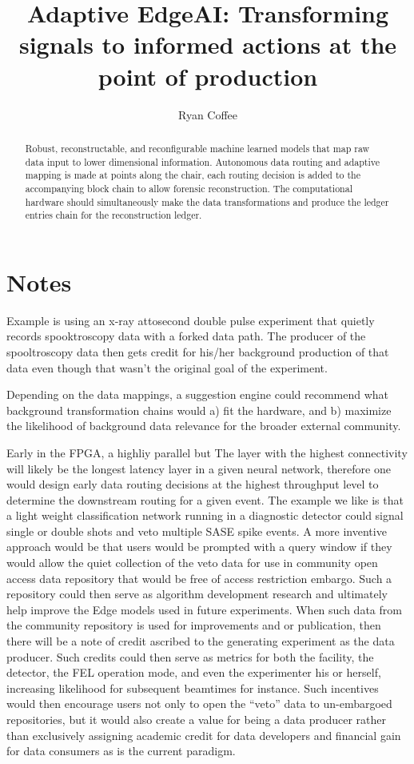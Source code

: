 \documentclass{article}
\title{Adaptive EdgeAI: Transforming signals to informed actions at the point of production}
\author{Ryan Coffee}
\begin{document}
\begin{abstract}
	Robust, reconstructable, and reconfigurable machine learned models that map raw data input to lower dimensional information. Autonomous data routing and adaptive mapping is made at points along the chair, each routing decision is added to the accompanying block chain to allow forensic reconstruction. The computational hardware should simultaneously make the data transformations and produce the ledger entries chain for the reconstruction ledger.

\end{abstract}


\maketitle

\section{Notes}


Example is using an x-ray attosecond double pulse experiment that quietly records spooktroscopy data with a forked data path. The producer of the spooltroscopy data then gets credit for his/her background production of that data even though that wasn’t the original goal of the experiment.

Depending on the data mappings, a suggestion engine could recommend what background transformation chains would a) fit the hardware, and b) maximize the likelihood of background data relevance for the broader external community.

Early in the FPGA, a highliy parallel but 
The layer with the highest connectivity will likely be the longest latency layer in a given neural network, therefore one would design early data routing decisions at the highest throughput level to determine the downstream routing for a given event.  
The example we like is that a light weight classification network running in a diagnostic detector could signal single or double shots and veto multiple SASE spike events.
A more inventive approach would be that users would be prompted with a query window if they would allow the quiet collection of the veto data for use in community open access data repository that would be free of access restriction embargo.
Such a repository could then serve as algorithm development research and ultimately help improve the Edge models used in future experiments.
When such data from the community repository is used for improvements and or publication, then there will be a note of credit ascribed to the generating experiment as the data producer.
Such credits could then serve as metrics for both the facility, the detector, the FEL operation mode, and even the experimenter his or herself, increasing likelihood for subsequent beamtimes for instance.
Such incentives would then encourage users not only to open the ``veto'' data to un-embargoed repositories, but it would also create a value for being a data producer rather than exclusively assigning academic credit for data developers and financial gain for data consumers as is the current paradigm.
\end{document}

